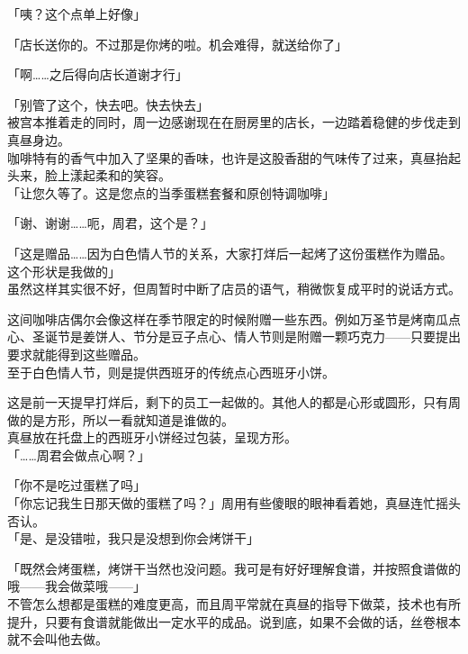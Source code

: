 「咦？这个点单上好像」

「店长送你的。不过那是你烤的啦。机会难得，就送给你了」

「啊……之后得向店长道谢才行」

「别管了这个，快去吧。快去快去」\\

被宫本推着走的同时，周一边感谢现在在厨房里的店长，一边踏着稳健的步伐走到真昼身边。\\

咖啡特有的香气中加入了坚果的香味，也许是这股香甜的气味传了过来，真昼抬起头来，脸上漾起柔和的笑容。\\

「让您久等了。这是您点的当季蛋糕套餐和原创特调咖啡」

「谢、谢谢……呃，周君，这个是？」

「这是赠品……因为白色情人节的关系，大家打烊后一起烤了这份蛋糕作为赠品。这个形状是我做的」\\

虽然这样其实很不好，但周暂时中断了店员的语气，稍微恢复成平时的说话方式。

这间咖啡店偶尔会像这样在季节限定的时候附赠一些东西。例如万圣节是烤南瓜点心、圣诞节是姜饼人、节分是豆子点心、情人节则是附赠一颗巧克力——只要提出要求就能得到这些赠品。\\

至于白色情人节，则是提供西班牙的传统点心西班牙小饼。

这是前一天提早打烊后，剩下的员工一起做的。其他人的都是心形或圆形，只有周做的是方形，所以一看就知道是谁做的。\\

真昼放在托盘上的西班牙小饼经过包装，呈现方形。\\

「……周君会做点心啊？」

「你不是吃过蛋糕了吗」\\

「你忘记我生日那天做的蛋糕了吗？」周用有些傻眼的眼神看着她，真昼连忙摇头否认。\\

「是、是没错啦，我只是没想到你会烤饼干」

「既然会烤蛋糕，烤饼干当然也没问题。我可是有好好理解食谱，并按照食谱做的哦——我会做菜哦——」\\

不管怎么想都是蛋糕的难度更高，而且周平常就在真昼的指导下做菜，技术也有所提升，只要有食谱就能做出一定水平的成品。说到底，如果不会做的话，丝卷根本就不会叫他去做。\\

